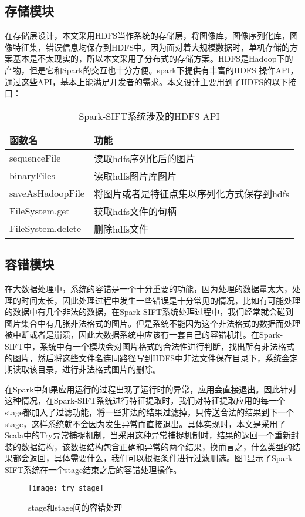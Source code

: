 \subsection{存储模块}
在存储层设计，本文采用HDFS当作系统的存储层，将图像库，图像序列化库，图像特征集，错误信息均保存到HDFS中。因为面对着大规模数据时，单机存储的方案基本是不太现实的，所以本文采用了分布式的存储方案。HDFS是Hadoop下的产物，但是它和Spark的交互也十分方便。spark下提供有丰富的HDFS 操作API，通过这些API，基本上能满足开发者的需求。本文设计主要用到了HDFS的以下接口：
\begin{table}[h] %
\caption{Spark-SIFT系统涉及的HDFS API} %
\centering
\label{tab:HDFS_API}
\begin{tabular}{p{3cm}|p{8cm}} %
\hline
\hline
函数名  &  功能 \\ %
\hline %
sequenceFile   & 读取hdfs序列化后的图片\\
\hline
binaryFiles   & 读取hdfs图片库图片\\
\hline
saveAsHadoopFile  & 将图片或者是特征点集以序列化方式保存到hdfs\\
\hline
FileSystem.get & 获取hdfs文件的句柄\\
\hline
FileSystem.delete & 删除hdfs文件\\
\hline
\hline
\end{tabular}
\end{table}
\subsection{容错模块}
在大数据处理中，系统的容错是一个十分重要的功能，因为处理的数据量太大，处理的时间太长，因此处理过程中发生一些错误是十分常见的情况，比如有可能处理的数据中有几个非法的数据，在Spark-SIFT系统处理过程中，我们经常就会碰到图片集合中有几张非法格式的图片。但是系统不能因为这个非法格式的数据而处理被中断或者是崩溃，因此大数据系统中应该有一套自己的容错机制。在Spark-SIFT中，系统中有一个模块会对图片格式的合法性进行判断，找出所有非法格式的图片，然后将这些文件名连同路径写到HDFS中非法文件保存目录下，系统会定期读取该目录，进行非法格式图片的删除。

在Spark中如果应用运行的过程出现了运行时的异常，应用会直接退出。因此针对这种情况，在Spark-SIFT系统进行特征提取时，我们对特征提取应用的每一个stage都加入了过滤功能，将一些非法的结果过滤掉，只传送合法的结果到下一个stage，这样系统就不会因为发生异常而直接退出。具体实现时，本文是采用了Scala中的Try异常捕捉机制，当采用这种异常捕捉机制时，结果的返回一个重新封装的数据结构，该数据结构包含正确和异常的两个结果，换而言之，什么类型的结果都会返回，具体需要什么，我们可以根据条件进行过滤删选。图\ref{fig:try_stage}显示了Spark-SIFT系统在一个stage结束之后的容错处理操作。
\begin{figure}[htp]
\centering
\texttt{[image: try\_stage]}
\caption{stage和stage间的容错处理}
\label{fig:try_stage}
\end{figure}
